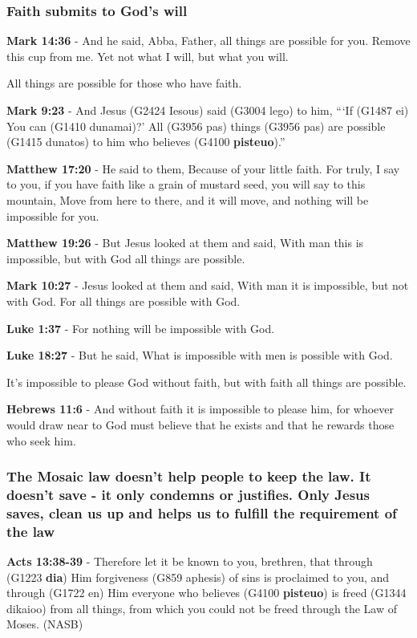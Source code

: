 \documentclass[11pt]{article}
\begin{document}
\subsubsection{Faith submits to God's will}
\label{sec:org22a6859}
\textbf{Mark 14:36} - And he said, Abba, Father, all things are possible for you. Remove this cup from me. Yet not what I will, but what you will.

All things are possible for those who have faith.

\textbf{Mark 9:23} - And Jesus (G2424 Iesous) said (G3004 lego) to him, “‘If (G1487 ei) You can (G1410 dunamai)?’ All (G3956 pas) things (G3956 pas) are possible (G1415 dunatos) to him who believes (G4100 \textbf{pisteuo}).”

\textbf{Matthew 17:20} - He said to them, Because of your little faith. For truly, I say to you, if you have faith like a grain of mustard seed, you will say to this mountain, Move from here to there, and it will move, and nothing will be impossible for you.

\textbf{Matthew 19:26} - But Jesus looked at them and said, With man this is impossible, but with God all things are possible.

\textbf{Mark 10:27} - Jesus looked at them and said, With man it is impossible, but not with God. For all things are possible with God.

\textbf{Luke 1:37} - For nothing will be impossible with God.

\textbf{Luke 18:27} - But he said, What is impossible with men is possible with God.

It's impossible to please God without faith, but with faith all things are possible.

\textbf{Hebrews 11:6} - And without faith it is impossible to please him, for whoever would draw near to God must believe that he exists and that he rewards those who seek him.

\subsubsection{The Mosaic law doesn't help people to keep the law. It doesn't save - it only condemns or justifies. Only Jesus saves, clean us up and helps us to fulfill the requirement of the law}
\label{sec:org182621c}

\textbf{Acts 13:38-39} - Therefore let it be known to you, brethren, that through (G1223 \textbf{dia}) Him forgiveness (G859 aphesis) of sins is proclaimed to you, and through (G1722 en) Him everyone who believes (G4100 \textbf{pisteuo}) is freed (G1344 dikaioo) from all things, from which you could not be freed through the Law of Moses. (NASB)
\end{document}
